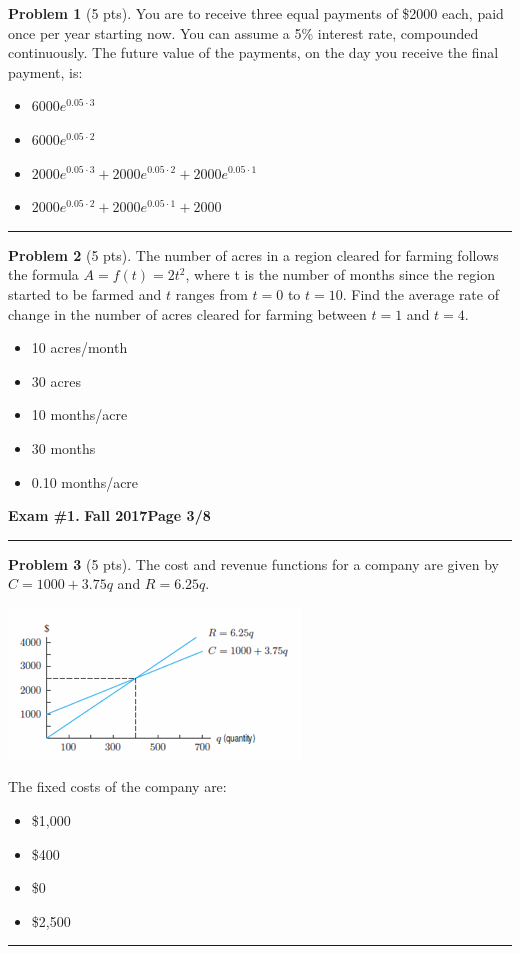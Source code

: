 \documentclass[12pt]{article}
\makeatletter
\theoremstyle{definition}
\newtheorem{problem}{Problem}
\newcommand*{\radiobutton}{%
  \@ifstar{\@radiobutton0}{\@radiobutton1}%
}
\newcommand*{\@radiobutton}[1]{%
  \begin{tikzpicture}
    \pgfmathsetlengthmacro\radius{height("X")/2}
    \draw[radius=\radius] circle;
    \ifcase#1 \fill[radius=.6*\radius] circle;\fi
  \end{tikzpicture}%
}
\makeatother
\begin{document}
\begin{problem}[5 pts]
You are to receive three equal payments of \$2000 each, paid once per year starting now. You can assume a 5\% interest rate, compounded continuously. The future value of the payments, on the day you receive the final payment, is:
\begin{itemize}
\item[\radiobutton] $6000 e^{0.05 \cdot 3}$
\item[\radiobutton] $6000 e^{0.05 \cdot 2}$
\item[\radiobutton] $2000 e^{0.05 \cdot 3} + 2000 e^{0.05 \cdot 2} + 2000 e^{0.05 \cdot 1}$
\item[\radiobutton] $2000 e^{0.05 \cdot 2} + 2000 e^{0.05 \cdot 1} + 2000$
\end{itemize}
\end{problem}
\hrule

\begin{problem}[5 pts]
The number of acres in a region cleared for farming follows the formula $A = f (t) = 2t^2$, where t is the number of months since the region started to be farmed and $t$ ranges from $t = 0$ to $t = 10$. Find the average rate of change in the number of acres cleared for farming between $t = 1$ and $t = 4$. 
\begin{itemize}
\item[\radiobutton] 10 acres/month
\item[\radiobutton] 30 acres
\item[\radiobutton] 10 months/acre
\item[\radiobutton] 30 months
\item[\radiobutton] 0.10 months/acre
\end{itemize}
\end{problem}

\newpage

\hfill{\large\bf Exam \#1.}\hfill{\large\bf
  Fall 2017}\hfill{\large\bf Page 3/8}\hrule

\bigskip
\begin{problem}[5 pts]
The cost and revenue functions for a company are given by $C = 1000 + 3.75q$ and $R = 6.25q$.
\begin{center}
\includegraphics{1graph1.png}
\end{center}
The fixed costs of the company are:
\begin{itemize}
\item[\radiobutton] \$1,000 
\item[\radiobutton] \$400
\item[\radiobutton] \$0
\item[\radiobutton] \$2,500
\end{itemize}
\end{problem}
\hrule
\end{document}
